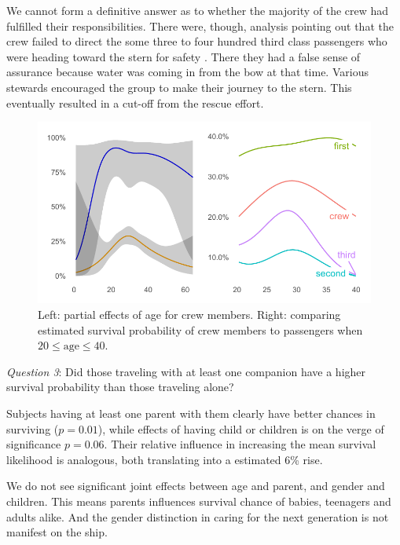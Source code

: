 \documentclass[]{interact}
\theoremstyle{plain}%
\theoremstyle{definition}
\theoremstyle{remark}
\begin{document}
We cannot form a definitive answer as to whether the majority of the crew had fulfilled their responsibilities. There were, though, analysis pointing out that the crew failed to direct the some three to four hundred third class passengers who were heading toward the stern for safety \citep{gleicher2004survived}. There they had a false sense of assurance because water was coming in from the bow at that time. Various stewards encouraged the group to make their journey to the stern. This eventually resulted in a cut-off from the rescue effort.

\begin{figure}[h]

{\centering \includegraphics{titanic-survival_files/figure-latex/partial-age-crew-1} 

}

\caption{Left: partial effects of age for crew members. Right: comparing estimated survival probability of crew members to passengers when \(20 \le\text{age} \le 40\).}\label{fig:partial-age-crew}
\end{figure}



\hfill\break

\emph{Question 3}: Did those traveling with at least one companion have a higher survival probability than those traveling alone?

Subjects having at least one parent with them clearly have better chances in surviving (\(p = 0.01\)), while effects of having child or children is on the verge of significance \(p = 0.06\). Their relative influence in increasing the mean survival likelihood is analogous, both translating into a estimated 6\% rise.

We do not see significant joint effects between age and parent, and gender and children. This means parents influences survival chance of babies, teenagers and adults alike. And the gender distinction in caring for the next generation is not manifest on the ship.
\end{document}

